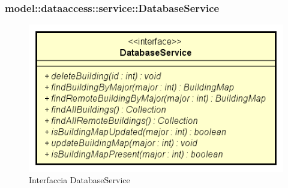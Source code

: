 \documentclass[../DefinizioneDiProdotto.tex]{subfiles}
\begin{document}
\subsubsection{model::dataaccess::service::DatabaseService}

    \begin{figure}[H]
        \centering
        \includegraphics{img/DatabaseService.png}
        \caption{Interfaccia DatabaseService}\label{fig:model::dataaccess::service::DatabaseService} 
    \end{figure}
\end{document}
